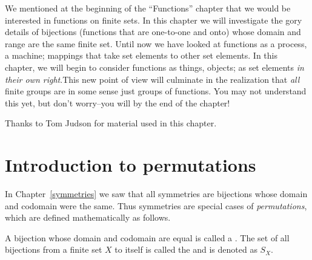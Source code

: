 We mentioned at the beginning of  the ``Functions'' chapter that we would be interested in functions on finite sets. In this chapter we will investigate the gory details of bijections (functions that are one-to-one and onto) whose domain and range are the same finite set. Until now we have looked at functions as a process, a machine; mappings that take set elements to other set elements. In this chapter, we will begin to consider functions as things, objects; as set elements \emph{in their own right}.This new point of view will culminate in the realization that \emph{all} finite groups are in some sense just groups of functions. You may not understand this yet, but don't worry--you will by the end of the chapter!
\bigskip


Thanks to Tom Judson for material used in this chapter.

\section{Introduction to permutations}

In Chapter~\ref{symmetries} we saw that all symmetries are  bijections whose domain and codomain were the same.  Thus symmetries are special cases of \emph{permutations}, which are defined mathematically as follows.

\begin{defn}
A bijection whose domain and codomain are equal is called a . The set of all bijections from a finite set $X$ to itself is called the  and is denoted as $S_X$.
\end{defn}

